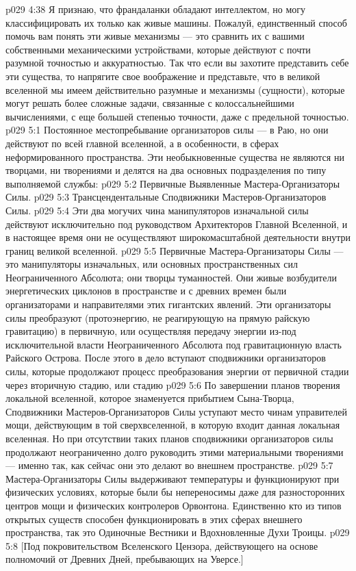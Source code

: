 \vs p029 4:38 Я признаю, что франдаланки обладают интеллектом, но могу классифицировать их только как живые машины. Пожалуй, единственный способ помочь вам понять эти живые механизмы --- это сравнить их с вашими собственными механическими устройствами, которые действуют с почти разумной точностью и аккуратностью. Так что если вы захотите представить себе эти существа, то напрягите свое воображение и представьте, что в великой вселенной мы имеем действительно разумные и  механизмы (сущности), которые могут решать более сложные задачи, связанные с колоссальнейшими вычислениями, с еще большей степенью точности, даже с предельной точностью.
\vs p029 5:1 Постоянное местопребывание организаторов силы --- в Раю, но они действуют по всей главной вселенной, а в особенности, в сферах неформированного пространства. Эти необыкновенные существа не являются ни творцами, ни творениями и делятся на два основных подразделения по типу выполняемой службы:
\vs p029 5:2 \bibnobreakspace Первичные Выявленные Мастера\hyp{}Организаторы Силы.
\vs p029 5:3 \bibnobreakspace Трансцендентальные Сподвижники Мастеров\hyp{}Организаторов Силы.
\vs p029 5:4 \pc Эти два могучих чина манипуляторов изначальной силы действуют исключительно под руководством Архитекторов Главной Вселенной, и в настоящее время они не осуществляют широкомасштабной деятельности внутри границ великой вселенной.
\vs p029 5:5 \pc Первичные Мастера\hyp{}Организаторы Силы --- это манипуляторы изначальных, или основных пространственных сил Неограниченного Абсолюта; они творцы туманностей. Они живые возбудители энергетических циклонов в пространстве и с древних времен были организаторами и направителями этих гигантских явлений. Эти организаторы силы преобразуют  (протоэнергию, не реагирующую на прямую райскую гравитацию) в первичную, или  осуществляя передачу энергии из\hyp{}под исключительной власти Неограниченного Абсолюта под гравитационную власть Райского Острова. После этого в дело вступают сподвижники организаторов силы, которые продолжают процесс преобразования энергии от первичной стадии через вторичную стадию, или стадию 
\vs p029 5:6 По завершении планов творения локальной вселенной, которое знаменуется прибытием Сына\hyp{}Творца, Сподвижники Мастеров\hyp{}Организаторов Силы уступают место чинам управителей мощи, действующим в той сверхвселенной, в которую входит данная локальная вселенная. Но при отсутствии таких планов сподвижники организаторов силы продолжают неограниченно долго руководить этими материальными творениями --- именно так, как сейчас они это делают во внешнем пространстве.
\vs p029 5:7 Мастера\hyp{}Организаторы Силы выдерживают температуры и функционируют при физических условиях, которые были бы непереносимы даже для разносторонних центров мощи и физических контролеров Орвонтона. Единственно кто из типов открытых существ способен функционировать в этих сферах внешнего пространства, так это Одиночные Вестники и Вдохновленные Духи Троицы.
\vsetoff
\vs p029 5:8 [Под покровительством Вселенского Цензора, действующего на основе полномочий от Древних Дней, пребывающих на Уверсе.]
